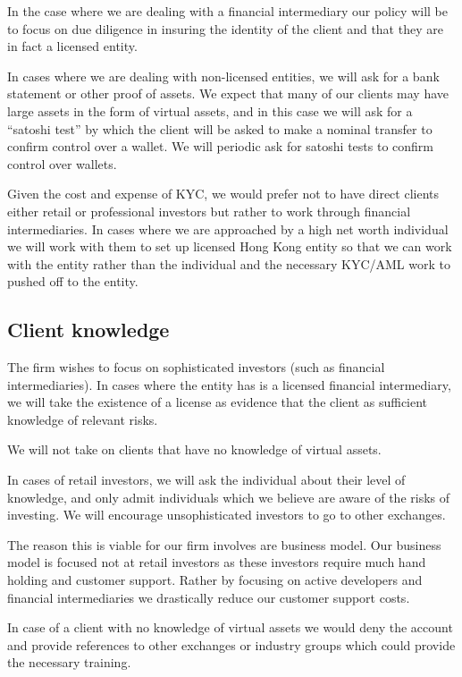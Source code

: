 In the case where we are dealing with a financial intermediary our
policy will be to focus on due diligence in insuring the identity of
the client and that they are in fact a licensed entity.

In cases where we are dealing with non-licensed entities, we will ask
for a bank statement or other proof of assets.  We expect that many of
our clients may have large assets in the form of virtual assets, and
in this case we will ask for a ``satoshi test'' by which the client
will be asked to make a nominal transfer to confirm control over a
wallet.  We will periodic ask for satoshi tests to confirm control
over wallets.

Given the cost and expense of KYC, we would prefer not to have direct
clients either retail or professional investors but rather to work
through financial intermediaries.  In cases where we are approached by
a high net worth individual we will work with them to set up licensed
Hong Kong entity so that we can work with the entity rather than the
individual and the necessary KYC/AML work to pushed off to the entity.

\subsection{Client knowledge}

The firm wishes to focus on sophisticated investors (such as financial
intermediaries).  In cases where the entity has is a licensed
financial intermediary, we will take the existence of a license as
evidence that the client as sufficient knowledge of relevant risks.

We will not take on clients that have no knowledge of virtual assets.

In cases of retail investors, we will ask the individual about their
level of knowledge, and only admit individuals which we believe are
aware of the risks of investing.  We will encourage unsophisticated
investors to go to other exchanges.

The reason this is viable for our firm involves are business model.
Our business model is focused not at retail investors as these
investors require much hand holding and customer support.  Rather by
focusing on active developers and financial intermediaries we
drastically reduce our customer support costs.

In case of a client with no knowledge of virtual assets we would deny
the account and provide references to other exchanges or industry
groups which could provide the necessary training.


